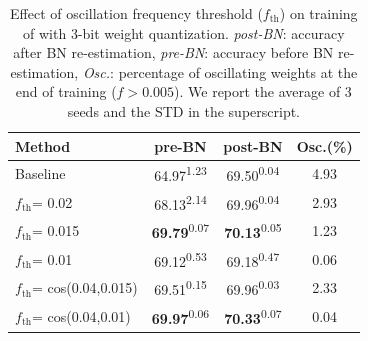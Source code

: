 \begin{table}[t]
    \centering
    \begin{tabular}{ l | c  c c }
    \toprule
  Method &   pre-BN & post-BN & Osc.(\%)\\
        \midrule
Baseline & 64.97\textsuperscript{1.23} & 69.50\textsuperscript{0.04} &  4.93 \\
\midrule
$f_{\text{th}}$= 0.02 & 68.13\textsuperscript{2.14}  & 69.96\textsuperscript{0.04} &   2.93 \\
$f_{\text{th}}$= 0.015 & \textbf{69.79}\textsuperscript{0.07} & \textbf{70.13}\textsuperscript{0.05} &  1.23\\
$f_{\text{th}}$= 0.01  &  69.12\textsuperscript{0.53} & 69.18\textsuperscript{0.47}  &   0.06 \\
\midrule
$f_{\text{th}}$= cos(0.04,0.015)  &  69.51\textsuperscript{0.15}  & 69.96\textsuperscript{0.03} &  2.33 \\
$f_{\text{th}}$= cos(0.04,0.01)  &  \textbf{69.97}\textsuperscript{0.06}  & \textbf{70.33}\textsuperscript{0.07} &  0.04 \\
\bottomrule
\end{tabular}
 \caption{Effect of oscillation frequency threshold ($f_{\text{th}}$) on training of  with 3-bit weight quantization. \textit{post-BN}: accuracy after BN re-estimation, \textit{pre-BN}: accuracy before BN re-estimation, \textit{Osc.}: percentage of oscillating weights at the end of training ($f>0.005$). We report the average of 3 seeds and the STD in the superscript.}
 \label{tbl:weight_freezing_ablation}
\end{table}



